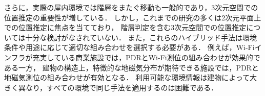 さらに，実際の屋内環境では階層をまたぐ移動も一般的であり，3次元空間での位置推定の重要性が増している．
しかし，これまでの研究の多くは2次元平面上での位置推定に焦点を当てており，
階層判定を含む3次元空間での位置推定については十分な検討がなされていない．
また，これらのハイブリッド手法は環境条件や用途に応じて適切な組み合わせを選択する必要がある．
例えば，Wi-Fiインフラが充実している商業施設では，PDRとWi-Fi測位の組み合わせが効果的である一方，
建物の構造上，特徴的な地磁気分布が期待できる施設では，PDRと地磁気測位の組み合わせが有効となる．
利用可能な環境情報は建物によって大きく異なり，すべての環境で同じ手法を適用するのは困難である．





